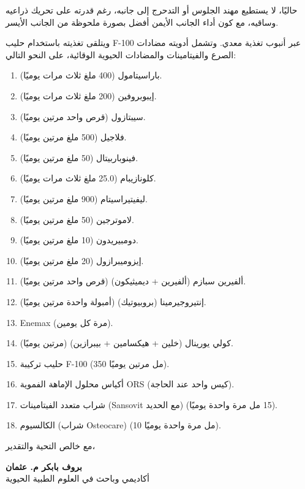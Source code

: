 \documentclass[12pt,a4paper]{article}
\begin{document}
حاليًا، لا يستطيع مهند الجلوس أو التدحرج إلى جانبه، رغم قدرته على تحريك ذراعيه وساقيه، مع كون أداء الجانب الأيمن أفضل بصورة ملحوظة من الجانب الأيسر.

ويتلقى تغذيته باستخدام حليب \textenglish{F-100} عبر أنبوب تغذية معدي. وتشمل أدويته مضادات الصرع والفيتامينات والمضادات الحيوية الوقائية، على النحو التالي:

\begin{enumerate}[label=\arabic*. ,leftmargin=*,itemsep=3pt]
\item باراسيتامول (400 ملغ ثلاث مرات يوميًا).
\item إيبوبروفين (200 ملغ ثلاث مرات يوميًا).
\item سيبتازول (قرص واحد مرتين يوميًا).
\item فلاجيل (500 ملغ مرتين يوميًا).
\item فينوباربيتال (50 ملغ مرتين يوميًا).
\item كلونازيبام (25.0 ملغ ثلاث مرات يوميًا).
\item ليفيتيراسيتام (900 ملغ مرتين يوميًا).
\item لاموترجين (50 ملغ مرتين يوميًا).
\item دومبيريدون (10 ملغ مرتين يوميًا).
\item إيزوميبرازول (20 ملغ مرتين يوميًا).
\item ألفيرين سبازم (ألفيرين + ديميثيكون) (قرص واحد مرتين يوميًا).
\item إنتيروجيرمينا (بروبيوتيك) (أمبولة واحدة مرتين يوميًا).
\item \textenglish{Enemax} (مرة كل يومين).
\item كولي يورينال (خلين + هيكسامين + بيبرازين) (مرتين يوميًا).
\item حليب تركيبة \textenglish{F-100} (350 مل مرتين يوميًا).
\item أكياس محلول الإماهة الفموية \textenglish{ORS} (كيس واحد عند الحاجة).
\item شراب متعدد الفيتامينات (\textenglish{Sansovit} مع الحديد) (15 مل مرة واحدة يوميًا).
\item الكالسيوم (شراب \textenglish{Osteocare}) (10 مل مرة واحدة يوميًا).
\end{enumerate}

\vspace{1em}
مع خالص التحية والتقدير،

\textbf{بروف بابكر م. عثمان}\\
أكاديمي وباحث في العلوم الطبية الحيوية
\end{document}
